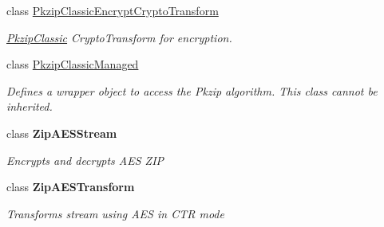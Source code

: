 \begin{DoxyCompactItemize}
class \hyperlink{class_i_c_sharp_code_1_1_sharp_zip_lib_1_1_encryption_1_1_pkzip_classic_encrypt_crypto_transform}{Pkzip\+Classic\+Encrypt\+Crypto\+Transform}
\begin{DoxyCompactList}\small\item\em \hyperlink{class_i_c_sharp_code_1_1_sharp_zip_lib_1_1_encryption_1_1_pkzip_classic}{Pkzip\+Classic} Crypto\+Transform for encryption. \end{DoxyCompactList}\item 
class \hyperlink{class_i_c_sharp_code_1_1_sharp_zip_lib_1_1_encryption_1_1_pkzip_classic_managed}{Pkzip\+Classic\+Managed}
\begin{DoxyCompactList}\small\item\em Defines a wrapper object to access the Pkzip algorithm. This class cannot be inherited. \end{DoxyCompactList}\item 
class {\bfseries Zip\+A\+E\+S\+Stream}
\begin{DoxyCompactList}\small\item\em Encrypts and decrypts A\+ES Z\+IP \end{DoxyCompactList}\item 
class {\bfseries Zip\+A\+E\+S\+Transform}
\begin{DoxyCompactList}\small\item\em Transforms stream using A\+ES in C\+TR mode \end{DoxyCompactList}\end{DoxyCompactItemize}
